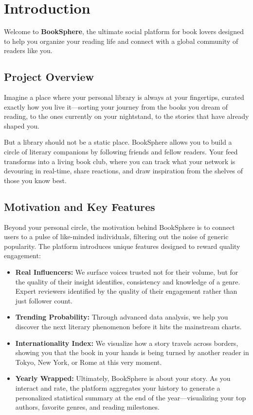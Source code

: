 \chapter{Introduction}
\label{sec:introduction}

Welcome to \textbf{BookSphere}, the ultimate social platform for book lovers designed to help you organize your reading life and connect with a global community of readers like you.

\section{Project Overview}
Imagine a place where your personal library is always at your fingertips, curated exactly how you live it—sorting your journey from the books you dream of reading, to the ones currently on your nightstand, to the stories that have already shaped you. 

But a library should not be a static place. BookSphere allows you to build a circle of literary companions by following friends and fellow readers. Your feed transforms into a living book club, where you can track what your network is devouring in real-time, share reactions, and draw inspiration from the shelves of those you know best.

\section{Motivation and Key Features}
Beyond your personal circle, the motivation behind BookSphere is to connect users to a pulse of like-minded individuals, filtering out the noise of generic popularity. The platform introduces unique features designed to reward quality engagement:

\begin{itemize}
    \item \textbf{Real Influencers:} We surface voices trusted not for their volume, but for the quality of their insight identifies, consistency and knowledge of a genre. Expert reviewers identified by the quality of their engagement rather than just follower count.
    \item \textbf{Trending Probability:} Through advanced data analysis, we help you discover the next literary phenomenon before it hits the mainstream charts.
    \item \textbf{Internationality Index:} We visualize how a story travels across borders, showing you that the book in your hands is being turned by another reader in Tokyo, New York, or Rome at this very moment.
    \item \textbf{Yearly Wrapped:} Ultimately, BookSphere is about your story. As you interact and rate, the platform aggregates your history to generate a personalized statistical summary at the end of the year—visualizing your top authors, favorite genres, and reading milestones.
\end{itemize}